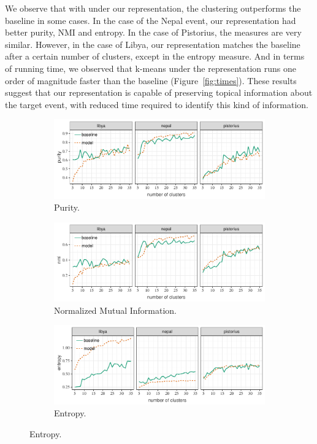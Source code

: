 
We observe that with under our representation, the clustering outperforms the
baseline in some cases. 
%
In the case of the Nepal event, our representation had better purity, NMI and
entropy. 
%
In the case of Pistorius, the measures are very similar. 
%
However, in the case of Libya, our representation matches the baseline after a
certain number of clusters, except in the entropy measure.
%
And in terms of running time, we observed that k-means under the representation
runs one order of magnitude faster than the baseline (Figure~\ref{fig:times}). 
%
These results suggest that our representation is capable of preserving topical
information about the target event, with reduced time required to identify this
kind of information.
 

\begin{figure}
  \centering
  \begin{subfigure}[b]{0.478\textwidth}
      \centering
      \includegraphics[width=\textwidth]{figures/url-model/purity}
      \caption{Purity.}
  \end{subfigure}%

  \begin{subfigure}[b]{0.478\textwidth}
      \centering
      \includegraphics[width=\textwidth]{figures/url-model/nmi} 
      \caption{Normalized Mutual Information.}
  \end{subfigure}

  \begin{subfigure}[b]{0.478\textwidth}
    \centering
    \includegraphics[width=\textwidth]{figures/url-model/entropy} 
    \caption{Entropy.}
  \end{subfigure}


\end{figure}
